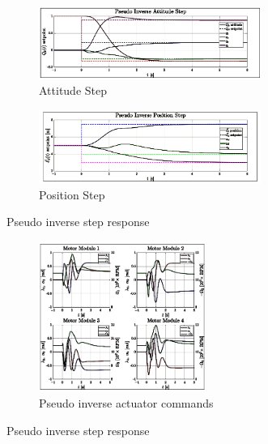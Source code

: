 \begin{figure}[hbtp]
\centering
\begin{subfigure}{\textwidth}
\centering
\includegraphics[width=0.8\textwidth]{graphs/pseudo_inverse_attitude}
\vspace{-4pt}
\caption{Attitude Step}
\label{fig:pseudo_inverse_attitude}
\end{subfigure}
\begin{subfigure}{\textwidth}
\vspace{-3pt}
\centering
\includegraphics[width=0.8\textwidth]{graphs/pseudo_inverse_position}
\caption{Position Step}
\label{fig:pseudo_inverse_position}
\end{subfigure}
\vspace{-2pt}
\caption{Pseudo inverse step response}
\label{fig:pseudo-inverse-step}
\vspace{-12pt}
\end{figure}
\par
\begin{figure}[htbp]
\ContinuedFloat
\begin{subfigure}{\textwidth}
\centering
\includegraphics[width=0.6\textwidth]{graphs/pseudo_inverse_input}
\vspace{-6pt}
\caption{Pseudo inverse actuator commands}
\label{fig:pseudo_inverse_input}
\end{subfigure}
\vspace{-10pt}
\caption{Pseudo inverse step response}
\vspace{-16pt}
\end{figure}
